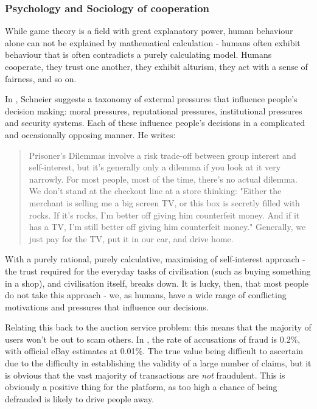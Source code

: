 \documentclass{article}
\begin{document}
\subsubsection{Psychology and Sociology of cooperation}
\label{sec:psychology-sociology-cooperation}
While game theory is a field with great explanatory power, human behaviour alone can not be explained by mathematical calculation - humans often exhibit behaviour that is often contradicts a purely calculating model. Humans cooperate, they trust one another, they exhibit alturism\cite{fehr2003nature}, they act with a sense of fairness\cite{forsythe1994fairness}, and so on.

In \cite{Schneier2012}, Schneier suggests a taxonomy of external pressures that influence people's decision making: moral pressures, reputational pressures, institutional pressures and security systems. Each of these influence people's decisions in a complicated and occasionally opposing manner. He writes\cite[p63]{Schneier2012}:

\begin{quotation}
Prisoner's Dilemmas involve a risk trade-off between group interest and self-interest, but it's generally only a dilemma if you look at it very narrowly. For most people, most of the time, there's no actual dilemma. We don't stand at the checkout line at a store thinking: "Either the merchant is selling me a big screen TV, or this box is secretly filled with rocks. If it's rocks, I'm better off giving him counterfeit money. And if it has a TV, I'm still better off giving him counterfeit money." Generally, we just pay for the TV, put it in our car, and drive home.
\end{quotation}

With a purely rational, purely calculative, maximising of self-interest approach - the trust required for the everyday tasks of civilisation (such as buying something in a shop), and civilisation itself, breaks down. It is lucky, then, that most people do not take this approach - we, as humans, have a wide range of conflicting motivations and pressures that influence our decisions.

Relating this back to the auction service problem: this means that the majority of users won't be out to scam others. In \cite{gregg2008typology}, the rate of accusations of fraud is 0.2\%, with official eBay estimates at 0.01\%. The true value being difficult to ascertain due to the difficulty in establishing the validity of a large number of claims, but it is obvious that the vast majority of transactions are \emph{not} fraudulent. This is obviously a positive thing for the platform, as too high a chance of being defrauded is likely to drive people away.
\end{document}
